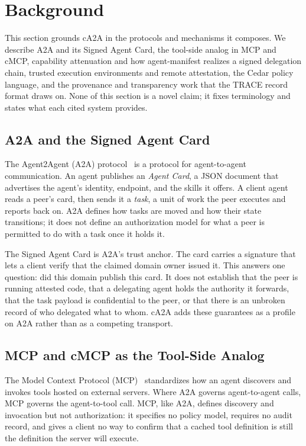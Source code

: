 \section{Background}\label{sec:background}

This section grounds cA2A in the protocols and mechanisms it composes. We describe A2A
and its Signed Agent Card, the tool-side analog in MCP and cMCP, capability attenuation
and how agent-manifest realizes a signed delegation chain, trusted execution environments
and remote attestation, the Cedar policy language, and the provenance and transparency
work that the TRACE record format draws on. None of this section is a novel claim; it
fixes terminology and states what each cited system provides.

\subsection{A2A and the Signed Agent Card}

The Agent2Agent (A2A) protocol~\citep{a2a2026} is a protocol for agent-to-agent
communication. An agent publishes an \emph{Agent Card}, a JSON document
that advertises the agent's identity, endpoint, and the skills it offers. A client agent
reads a peer's card, then sends it a \emph{task}, a unit of work the peer executes and
reports back on. A2A defines how tasks are moved and how their state transitions; it does
not define an authorization model for what a peer is permitted to do with a task once it
holds it.

The Signed Agent Card is A2A's trust anchor. The card carries a signature that lets a
client verify that the claimed domain owner issued it. This answers one question: did this
domain publish this card. It does not establish that the peer is running attested code,
that a delegating agent holds the authority it forwards, that the task payload is
confidential to the peer, or that there is an unbroken record of who delegated what to
whom. cA2A adds these guarantees as a profile on A2A rather than as a competing transport.

\subsection{MCP and cMCP as the Tool-Side Analog}

The Model Context Protocol (MCP)~\citep{mcp2024} standardizes how an agent discovers and
invokes tools hosted on external servers. Where A2A governs agent-to-agent calls, MCP
governs the agent-to-tool call. MCP, like A2A, defines discovery and invocation but not
authorization: it specifies no policy model, requires no audit record, and gives a client
no way to confirm that a cached tool definition is still the definition the server will
execute.

